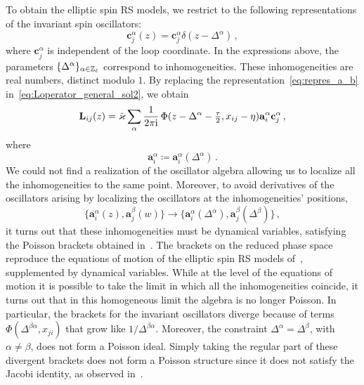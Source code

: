To obtain the elliptic spin RS models, we restrict to the following representations of the invariant spin oscillators:
\begin{equation}
\label{eq:repres_a_b}
\mathbf{c}_j^\alpha(z) = \mathbf{c}_j^\alpha \delta(z - \Delta^\alpha) \,,
\end{equation}
where $\mathbf{c}_j^\alpha$ is independent of the loop coordinate.
In the expressions above, the parameters $\{\Delta^\alpha \}_{\alpha \in \mathbb{Z}_\ell}$ correspond to inhomogeneities. These inhomogeneities are real numbers, distinct modulo $1$. By replacing the representation~\eqref{eq:repres_a_b} in~\eqref{eq:Loperator_general_sol2}, we obtain
\begin{equation}
\label{eq:Loperator_specific_sol}
\mathbf{L}_{ij}(z)=\tilde{\varkappa}\sum_\alpha \frac{1}{2 \pi \mathrm{i} } \,  \Phi(z-\Delta^\alpha-\tfrac{\tau}{2}, x_{ij}- \eta) \mathbf{a}_i^\alpha\mathbf{c}_j^\alpha \,, 
\end{equation}
where
\begin{equation}
\mathbf{a}_i^\alpha \coloneq \mathbf{a}_i^\alpha(\Delta^\alpha) \,.
\end{equation}
We could not find a realization of the oscillator algebra allowing us to localize all the inhomogeneities to the same point. Moreover, to avoid derivatives of the oscillators arising by localizing the oscillators at the inhomogeneities' positions,
\begin{equation}
 \{ \mathbf{a}_i^\alpha(z),\mathbf{a}_j^\beta(w) \} \to \{ \mathbf{a}_i^\alpha(\Delta^\alpha),\mathbf{a}_j^\beta(\Delta^\beta) \} \,,
\end{equation}
it turns out that these inhomogeneities must be dynamical variables, satisfying the Poisson brackets obtained in~\cite{arutyunov_elliptic_2026}. The brackets on the reduced phase space reproduce the equations of motion of the elliptic spin RS models of~\cite{krichever_spin_1995}, supplemented by dynamical variables. While at the level of the equations of motion it is possible to take the limit in which all the inhomogeneities coincide, it turns out that in this homogeneous limit the algebra is no longer Poisson. In particular, the brackets for the invariant oscillators diverge because of terms $\Phi(\Delta^{\beta\alpha}, x_{ji})$ that grow like $1/\Delta^{\beta \alpha}$. Moreover, the constraint $\Delta^\alpha=\Delta^\beta$, with $\alpha \ne \beta$, does not form a Poisson ideal. Simply taking the regular part of these divergent brackets does not form a Poisson structure since it does not satisfy the Jacobi identity, as observed in~\cite{arutyunov_elliptic_2026}.

